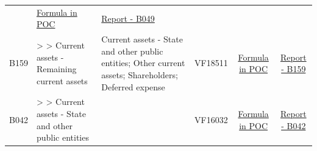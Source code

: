 \documentclass[]{book}
\begin{document}
\begin{longtable}[]{@{}cllccc@{}}
\begin{minipage}[t]{0.09\columnwidth}
\end{minipage} & \begin{minipage}[t]{0.15\columnwidth}\centering
\protect\hyperlink{b049---formula-in-poc}{Formula in POC}\strut
\end{minipage} & \begin{minipage}[t]{0.16\columnwidth}\centering
\href{./Auxiliary\%20Files/technical_reports/variable_report/B049(!).pdf}{Report - B049}\strut
\end{minipage}\tabularnewline
\begin{minipage}[t]{0.08\columnwidth}\centering
B159\strut
\end{minipage} & \begin{minipage}[t]{0.20\columnwidth}\raggedright
\textgreater{} \textgreater{} Current assets - Remaining current assets\strut
\end{minipage} & \begin{minipage}[t]{0.16\columnwidth}\raggedright
Current assets - State and other public entities; Other current assets; Shareholders; Deferred expense\strut
\end{minipage} & \begin{minipage}[t]{0.09\columnwidth}\centering
VF18511\strut
\end{minipage} & \begin{minipage}[t]{0.15\columnwidth}\centering
\protect\hyperlink{b159---formula-in-poc}{Formula in POC}\strut
\end{minipage} & \begin{minipage}[t]{0.16\columnwidth}\centering
\href{./Auxiliary\%20Files/technical_reports/variable_report/B159.pdf}{Report - B159}\strut
\end{minipage}\tabularnewline
\begin{minipage}[t]{0.08\columnwidth}\centering
B042\strut
\end{minipage} & \begin{minipage}[t]{0.20\columnwidth}\raggedright
\textgreater{} \textgreater{} Current assets - State and other public entities\strut
\end{minipage} & \begin{minipage}[t]{0.16\columnwidth}\raggedright
\strut
\end{minipage} & \begin{minipage}[t]{0.09\columnwidth}\centering
VF16032\strut
\end{minipage} & \begin{minipage}[t]{0.15\columnwidth}\centering
\protect\hyperlink{b042---formula-in-poc}{Formula in POC}\strut
\end{minipage} & \begin{minipage}[t]{0.16\columnwidth}\centering
\href{./Auxiliary\%20Files/technical_reports/variable_report/B042(!).pdf}{Report - B042}\strut
\end{minipage}\tabularnewline
\bottomrule
\end{longtable}
\end{document}
